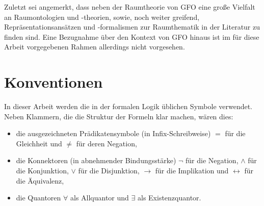 Zuletzt sei angemerkt, dass neben der Raumtheorie von GFO eine große Vielfalt an Raumontologien und -theorien, sowie, noch weiter greifend, Repräsentationsansätzen und -formalismen zur Raumthematik in der Literatur zu finden sind.
Eine Bezugnahme über den Kontext von GFO hinaus ist im für diese Arbeit vorgegebenen Rahmen allerdings nicht vorgesehen.


\section{Konventionen}
In dieser Arbeit werden die in der formalen Logik üblichen Symbole verwendet. Neben Klammern, die die Struktur der Formeln klar machen, wären dies:
\begin{itemize}
    \item 
        die ausgezeichneten Prädikatensymbole (in Infix-Schreibweise) $=$ für die Gleichheit und $\neq$ für deren Negation,
    \item 
        die Konnektoren (in abnehmender Bindungsstärke) $\neg$ für die Negation, $\land$ für die Konjunktion, $\lor$ für die Disjunktion, $\to$ für die Implikation und $\leftrightarrow$ für die Äquivalenz,
    \item 
        die Quantoren $\forall$ als Allquantor und $\exists$ als Existenzquantor.
\end{itemize}

